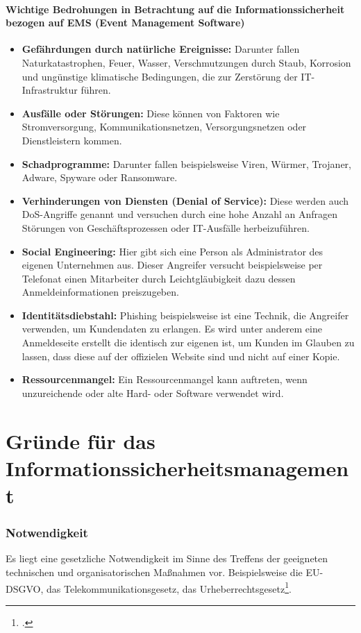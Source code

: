 \paragraph{Wichtige Bedrohungen in Betrachtung auf die Informationssicherheit bezogen auf EMS (Event Management Software)} %
\begin{itemize}
	\item \textbf{Gefährdungen durch natürliche Ereignisse:} Darunter fallen Naturkatastrophen, Feuer, Wasser, Verschmutzungen durch Staub, Korrosion und ungünstige klimatische Bedingungen, die zur Zerstörung der IT-Infrastruktur führen.
	\item \textbf{Ausfälle oder Störungen:} Diese können von Faktoren wie Stromversorgung, Kommunikationsnetzen, Versorgungsnetzen oder Dienstleistern kommen.
	\item \textbf{Schadprogramme:} Darunter fallen beispielsweise Viren, Würmer, Trojaner, Adware, Spyware oder Ransomware.
	\item \textbf{Verhinderungen von Diensten (Denial of Service):} Diese werden auch DoS-Angriffe genannt und versuchen durch eine hohe Anzahl an Anfragen Störungen von Geschäftsprozessen oder IT-Ausfälle herbeizuführen.
	\item \textbf{Social Engineering:} Hier gibt sich eine Person als Administrator des eigenen Unternehmen aus. Dieser Angreifer versucht beispielsweise per Telefonat einen Mitarbeiter durch Leichtgläubigkeit dazu dessen Anmeldeinformationen preiszugeben.
	\item \textbf{Identitätsdiebstahl:} Phishing beispielsweise ist eine Technik, die Angreifer verwenden, um Kundendaten zu erlangen. Es wird unter anderem eine Anmeldeseite erstellt die identisch zur eigenen ist, um Kunden im Glauben zu lassen, dass diese auf der offizielen Website sind und nicht auf einer Kopie.
	\item \textbf{Ressourcenmangel:} Ein Ressourcenmangel kann auftreten, wenn unzureichende oder alte Hard- oder Software verwendet wird. 
\end{itemize}

\section{Gründe für das Informationssicherheitsmanagement}
\subsubsection{Notwendigkeit}
Es liegt eine gesetzliche Notwendigkeit im Sinne des Treffens der geeigneten technischen und organisatorischen Maßnahmen vor. Beispielsweise die EU-DSGVO, das Telekommunikationsgesetz, das Urheberrechtsgesetz\footcite{Lehrunterlagen-HTL-cloud}.


